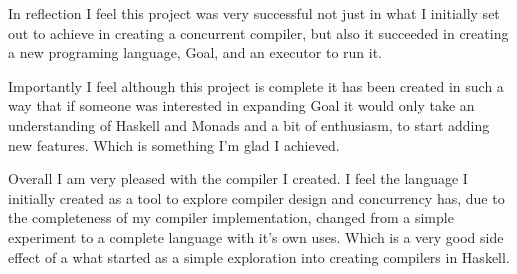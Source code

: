 In reflection I feel this project was very successful not just in what I initially set out to achieve in creating a concurrent compiler, but also it succeeded in creating a new programing language, Goal, and an executor to run it. 

Importantly I feel although this project is complete it has been created in such a way that if someone was interested in expanding Goal it would only take an understanding of Haskell and Monads and a bit of enthusiasm, to start adding new features. Which is something I'm glad I achieved. 

Overall I am very pleased with the compiler I created. I feel the language I initially created as a tool to explore compiler design and concurrency has, due to the completeness of my compiler implementation, changed from a simple experiment to a complete language with it's own uses. Which is a very good side effect of a what started as a simple exploration into creating compilers in Haskell. 



